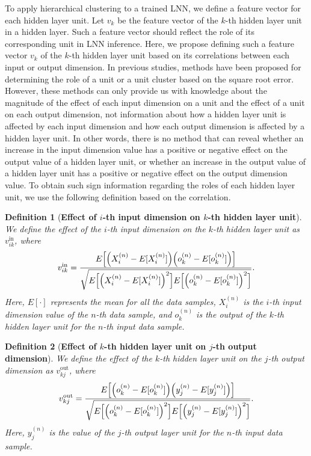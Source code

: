 \documentclass{article}
\newtheorem{definition}{Definition}
\begin{document}
To apply hierarchical clustering to a trained LNN, we define a feature vector for each hidden layer unit. Let $v_k$ be the feature vector of the $k$-th hidden layer unit in a hidden layer. Such a feature vector should reflect the role of its corresponding unit in LNN inference. Here, we propose defining such a feature vector $v_k$ of the $k$-th hidden layer unit based on its correlations between each input or output dimension. In previous studies\cite{Watanabe2018arxiv,Watanabe2018arxiv2}, methods have been proposed for determining the role of a unit or a unit cluster based on the square root error. However, these methods can only provide us with knowledge about the magnitude of the effect of each input dimension on a unit and the effect of a unit on each output dimension, not information about how a hidden layer unit is affected by each input dimension and how each output dimension is affected by a hidden layer unit. In other words, there is no method that can reveal whether an increase in the input dimension value has a positive or negative effect on the output value of a hidden layer unit, or whether an increase in the output value of a hidden layer unit has a positive or negative effect on the output dimension value. 
To obtain such sign information regarding the roles of each hidden layer unit, we use the following definition based on the correlation. 
\begin{definition}[\textbf{Effect of $i$-th input dimension on $k$-th hidden layer unit}]
We define the effect of the $i$-th input dimension on the $k$-th hidden layer unit as $v^{\mathrm{in}}_{ik}$, where
\begin{eqnarray*}
  v^{\mathrm{in}}_{ik}=\frac{E\Bigl[ \Bigl( X^{(n)}_i-E[X^{(n)}_i] \Bigr) \Bigl( o^{(n)}_k-E[o^{(n)}_k] \Bigr) \Bigr]}{\sqrt{E\Bigl[ \Bigl( X^{(n)}_i-E[X^{(n)}_i] \Bigr)^2 \Bigr]E\Bigl[ \Bigl( o^{(n)}_k-E[o^{(n)}_k] \Bigr)^2 \Bigr]}}.
\end{eqnarray*}
Here, $E[\cdot]$ represents the mean for all the data samples, $X^{(n)}_i$ is the $i$-th input dimension value of the $n$-th data sample, and $o^{(n)}_k$ is the output of the $k$-th hidden layer unit for the $n$-th input data sample. 
\end{definition}
\begin{definition}[\textbf{Effect of $k$-th hidden layer unit on $j$-th output dimension}]
We define the effect of the $k$-th hidden layer unit on the $j$-th output dimension as $v^{\mathrm{out}}_{kj}$, where
\begin{eqnarray*}
  v^{\mathrm{out}}_{kj}=\frac{E\Bigl[ \Bigl( o^{(n)}_k-E[o^{(n)}_k] \Bigr) \Bigl( y^{(n)}_j-E[y^{(n)}_j] \Bigr) \Bigr]}{\sqrt{E\Bigl[ \Bigl( o^{(n)}_k-E[o^{(n)}_k] \Bigr)^2 \Bigr]E\Bigl[ \Bigl( y^{(n)}_j-E[y^{(n)}_j] \Bigr)^2 \Bigr]}}.
\end{eqnarray*}
Here, $y^{(n)}_j$ is the value of the $j$-th output layer unit for the $n$-th input data sample. 
\end{definition}
\end{document}
